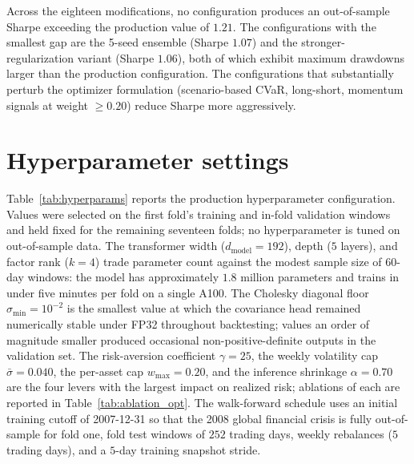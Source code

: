 \documentclass[11pt]{article}
\begin{document}
Across the eighteen modifications, no configuration produces an
out-of-sample Sharpe exceeding the production value of $1.21$. The
configurations with the smallest gap are the 5-seed ensemble (Sharpe
$1.07$) and the stronger-regularization variant (Sharpe $1.06$), both
of which exhibit maximum drawdowns larger than the production
configuration. The configurations that substantially perturb the
optimizer formulation (scenario-based CVaR, long-short, momentum
signals at weight $\geq 0.20$) reduce Sharpe more aggressively.

\section{Hyperparameter settings}\label{app:hyperparams}

Table~\ref{tab:hyperparams} reports the production hyperparameter
configuration. Values were selected on the first fold's training and
in-fold validation windows and held fixed for the remaining seventeen
folds; no hyperparameter is tuned on out-of-sample data. The
transformer width ($d_{\text{model}}=192$), depth ($5$ layers), and
factor rank ($k=4$) trade parameter count against the modest sample
size of 60-day windows: the model has approximately $1.8$ million
parameters and trains in under five minutes per fold on a single
A100. The Cholesky diagonal floor $\sigma_{\min}=10^{-2}$ is the
smallest value at which the covariance head remained numerically
stable under FP32 throughout backtesting; values an order of
magnitude smaller produced occasional non-positive-definite outputs
in the validation set. The risk-aversion coefficient $\gamma=25$, the
weekly volatility cap $\bar\sigma=0.040$, the per-asset cap
$w_{\max}=0.20$, and the inference shrinkage $\alpha=0.70$ are the
four levers with the largest impact on realized risk; ablations of
each are reported in Table~\ref{tab:ablation_opt}. The walk-forward
schedule uses an initial training cutoff of 2007-12-31 so that the
2008 global financial crisis is fully out-of-sample for fold one,
fold test windows of $252$ trading days, weekly rebalances ($5$ trading
days), and a $5$-day training snapshot stride.
\end{document}
